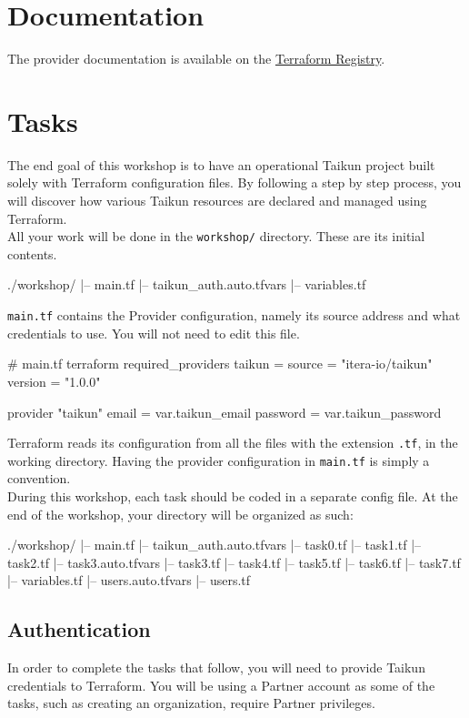 \section{Documentation}
The provider documentation is available on the \href{https://registry.terraform.io/providers/itera-io/taikun/latest/docs}{Terraform Registry}.

\section{Tasks}
The end goal of this workshop is to have an operational Taikun project built solely with Terraform
configuration files.
By following a step by step process, you will discover how various Taikun
resources are declared and managed using Terraform.\\

All your work will be done in the \texttt{workshop/} directory. These are its initial contents.
\begin{raw}
./workshop/
|-- main.tf
|-- taikun_auth.auto.tfvars
|-- variables.tf
\end{raw}
\texttt{main.tf} contains the Provider configuration,
namely its source address and what credentials to use.
You will not need to edit this file.
\begin{tf}
# main.tf
terraform {
  required_providers {
    taikun = {
      source = "itera-io/taikun"
      version = "1.0.0"
    }
  }
}

provider "taikun" {
  email    = var.taikun_email
  password = var.taikun_password
}
\end{tf}
Terraform reads its configuration from all the files with the extension \texttt{.tf},
in the working directory.
Having the provider configuration in \texttt{main.tf} is simply a convention.\\

During this workshop, each task should be coded in a separate config file.
At the end of the workshop, your directory will be organized as such:
\begin{raw}
./workshop/
|-- main.tf
|-- taikun_auth.auto.tfvars
|-- task0.tf
|-- task1.tf
|-- task2.tf
|-- task3.auto.tfvars
|-- task3.tf
|-- task4.tf
|-- task5.tf
|-- task6.tf
|-- task7.tf
|-- variables.tf
|-- users.auto.tfvars
|-- users.tf
\end{raw}

\subsection{Authentication}\label{sec:auth}
In order to complete the tasks that follow, you will need to provide Taikun credentials to Terraform.
You will be using a Partner account as some of the tasks, such as creating an organization,
require Partner privileges.\\

